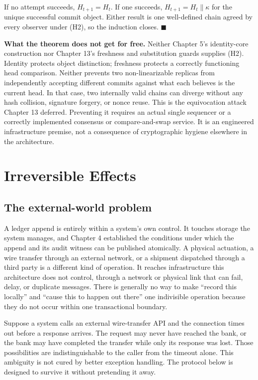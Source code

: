 \documentclass[11pt,openany]{book}
\begin{document}
If no attempt succeeds, \(H_{t+1}=H_t\). If one succeeds,
\(H_{t+1}=H_t\mathbin{\|}\kappa\) for the unique successful commit object.
Either result is one well-defined chain agreed by every observer under (H2),
so the induction closes. \(\blacksquare\)

\textbf{What the theorem does not get for free.} Neither Chapter 5's
identity-core construction nor Chapter 13's freshness and substitution guards
supplies (H2). Identity protects object distinction; freshness protects a
correctly functioning head comparison. Neither prevents two non-linearizable
replicas from independently accepting different commits against what each
believes is the current head. In that case, two internally valid chains can
diverge without any hash collision, signature forgery, or nonce reuse. This is
the equivocation attack Chapter 13 deferred. Preventing it requires an actual
single sequencer or a correctly implemented consensus or compare-and-swap
service. It is an engineered infrastructure premise, not a consequence of
cryptographic hygiene elsewhere in the architecture.

\chapter{Irreversible Effects}
\section{The external-world problem}
A ledger append is entirely within a system's own control. It touches storage
the system manages, and Chapter 4 established the conditions under which the
append and its audit witness can be published atomically. A physical
actuation, a wire transfer through an external network, or a shipment dispatched
through a third party is a different kind of operation. It reaches
infrastructure this architecture does not control, through a network or
physical link that can fail, delay, or duplicate messages. There is generally
no way to make “record this locally” and “cause this to happen out there”
one indivisible operation because they do not occur within one transactional
boundary.

Suppose a system calls an external wire-transfer API and the connection times
out before a response arrives. The request may never have reached the bank, or
the bank may have completed the transfer while only its response was lost.
Those possibilities are indistinguishable to the caller from the timeout
alone. This ambiguity is not cured by better exception handling. The protocol
below is designed to survive it without pretending it away.
\end{document}
